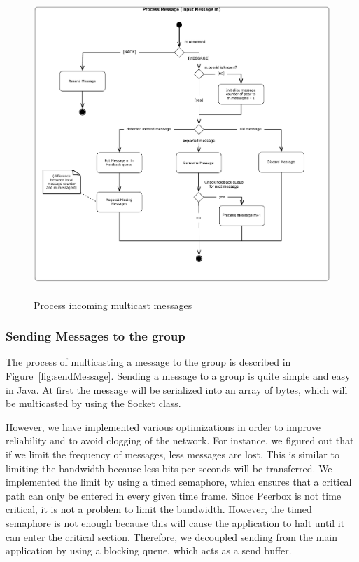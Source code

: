\begin{figure}[htbp]
    \centering
        \includegraphics[height=4.5in]{figures/processMessages.pdf}
    \caption{Process incoming multicast messages}
    \label{fig:figures_processMessages}
\end{figure}

\subsubsection{Sending Messages to the group}

The process of multicasting a message to the group is described in Figure~\ref{fig:sendMessage}. Sending a message to a group is quite simple and easy in Java. At first the message will be serialized into an array of bytes, which will be multicasted by using the Socket class. 

However, we have implemented various optimizations in order to improve reliability and to avoid clogging of the network. For instance, we figured out that if we limit the frequency of messages, less messages are lost. This is similar to limiting the bandwidth because less bits per seconds will be transferred.  
We implemented the limit by using a timed semaphore, which ensures that a critical path can only be entered in every given time frame. Since Peerbox is not time critical, it is not a  problem to limit the bandwidth. 
However, the timed semaphore is not enough because this will cause the application to halt until it can enter the critical section. Therefore, we decoupled  sending from the main application by using a blocking queue, which acts as a send buffer. 

